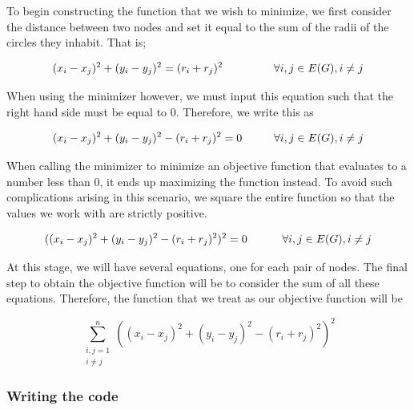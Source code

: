 \begin{flushleft}
To begin constructing the function that we wish to minimize, we first consider the distance between two nodes and set it equal to the sum of the radii of the circles they inhabit. That is;

\begin{equation*}
    (x_i - x_j)^2 + (y_i-y_j)^2 = (r_i + r_j)^2 \hspace{16mm} \forall i,j \in E(G), i \neq j
\end{equation*}

\vspace{2mm}
When using the minimizer however, we must input this equation such that the right hand side must be equal to 0. Therefore, we write this as 

\begin{equation*}
    (x_i - x_j)^2 + (y_i-y_j)^2 - (r_i + r_j)^2 = 0 \hspace{10mm} \forall i,j \in E(G), i \neq j
\end{equation*}

\vspace{2mm}
When calling the minimizer to minimize an objective function that evaluates to a number less than 0, it ends up maximizing the function instead. To avoid such complications arising in this scenario, we square the entire function so that the values we work with are strictly positive.

\begin{equation*}
    ((x_i - x_j)^2 + (y_i-y_j)^2 - (r_i + r_j)^2)^2 = 0 \hspace{11mm} \forall i,j \in E(G), i \neq j
\end{equation*}

\vspace{2mm}
At this stage, we will have several equations, one for each pair of nodes. The final step to obtain the objective function will be to consider the sum of all these equations. Therefore, the function that we treat as our objective function will be 

\begin{equation}\label{eq:circle_constraint}
    \sum_{\substack{i,j=1 \\ i \neq j}}^{n} \left( (x_i - x_j)^2 + (y_i - y_j)^2 - (r_i + r_j)^2 \right)^2
  \end{equation}
\end{flushleft}

\subsubsection{Writing the code}

